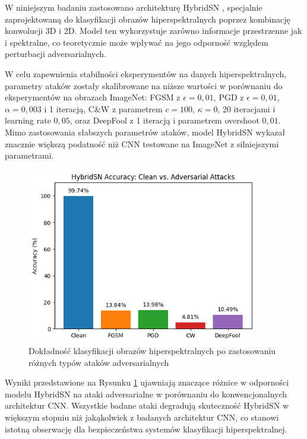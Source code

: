 \documentclass[12pt]{article}
\begin{document}
W niniejszym badaniu zastosowano architekturę HybridSN \supercite{roy2019hybridsn}, specjalnie zaprojektowaną do klasyfikacji obrazów hiperspektralnych poprzez kombinację konwolucji 3D i 2D. Model ten wykorzystuje zarówno informacje przestrzenne jak i spektralne, co teoretycznie może wpływać na jego odporność względem perturbacji adversarialnych.

W celu zapewnienia stabilności eksperymentów na danych hiperspektralnych, parametry ataków zostały skalibrowane na niższe wartości w porównaniu do eksperymentów na obrazach ImageNet: FGSM z $\epsilon = 0{,}01$, PGD z $\epsilon = 0{,}01$, $\alpha = 0{,}003$ i 1 iteracją, C\&W z parametrem $c = 100$, $\kappa = 0$, 20 iteracjami i learning rate $0{,}05$, oraz DeepFool z 1 iteracją i parametrem overshoot $0{,}01$. Mimo zastosowania słabszych parametrów ataków, model HybridSN wykazał znacznie większą podatność niż CNN testowane na ImageNet z silniejszymi parametrami.

\begin{figure}[H]
    \centering
    \includegraphics[width=0.9\textwidth]{hybridsn_accuracy.png} 
    \caption{Dokładność klasyfikacji obrazów hiperspektralnych po zastosowaniu różnych typów ataków adversarialnych}
    \label{fig:hyperspectral-accuracy}
\end{figure}

Wyniki przedstawione na Rysunku \ref{fig:hyperspectral-accuracy} ujawniają znaczące różnice w odporności modelu HybridSN na ataki adversarialne w porównaniu do konwencjonalnych architektur CNN. Wszystkie badane ataki degradują skuteczność HybridSN w większym stopniu niż jakąkolwiek z badanych architektur CNN, co stanowi istotną obserwację dla bezpieczeństwa systemów klasyfikacji hiperspektralnej.
\end{document}

